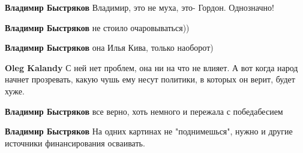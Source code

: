 \begin{itemize}
\begin{itemize}
 
\textbf{Владимир Быстряков} Владимир, это не муха, это- Гордон. Однозначно!

 
\textbf{Владимир Быстряков} не стоило очаровываться))

 
\textbf{Владимир Быстряков} она Илья Кива, только наоборот)

 
\textbf{Oleg Kalandy} С ней нет проблем, она ни на что не влияет. А вот когда народ начнет прозревать, какую чушь ему несут политики, в которых он верит, будет хуже.

 
\textbf{Владимир Быстряков} все верно, хоть немного и пережала с победабесием

 
\textbf{Владимир Быстряков} На одних картинах не "поднимешься", нужно и другие источники финансирования осваивать.

 

\end{itemize}
\end{itemize}
